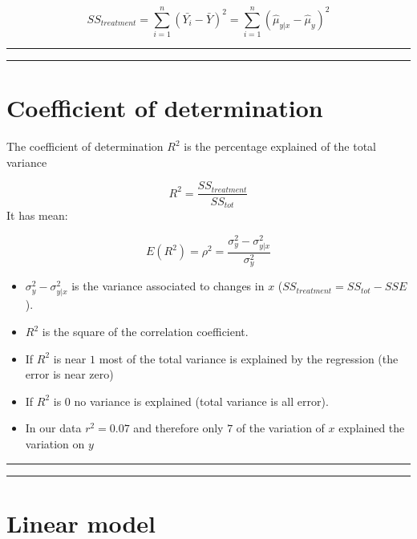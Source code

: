 \documentclass[
]{book}
\begin{document}
\[SS_{treatment}=\sum_{i=1}^n(\bar{Y_i}-\bar{Y})^2=\sum_{i=1}^n(\hat{\mu}_{y|x} -\hat{\mu}_y)^2\]

\begin{center}\rule{0.5\linewidth}{0.5pt}\end{center}

\begin{center}\rule{0.5\linewidth}{0.5pt}\end{center}

\hypertarget{coefficient-of-determination}{%
\section{Coefficient of determination}\label{coefficient-of-determination}}

The coefficient of determination \(R^2\) is the percentage explained of the total variance

\[R^2=\frac{SS_{treatment}}{SS_{tot}}\]
It has mean:

\[E(R^2)=\rho^2=\frac{\sigma^2_{y}-\sigma^2_{y|x}}{\sigma^2_{y}}\]

\begin{itemize}
\item
  \(\sigma_y^2-\sigma^2_{y|x}\) is the variance associated to changes in \(x\) (\(SS_{treatment}=SS_{tot} - SSE\)).
\item
  \(R^2\) is the square of the correlation coefficient.
\item
  If \(R^2\) is near \(1\) most of the total variance is explained by the regression (the error is near zero)
\item
  If \(R^2\) is \(0\) no variance is explained (total variance is all error).
\item
  In our data \(r^2=0.07\) and therefore only \(7%
  \) of the variation of \(x\) explained the variation on \(y\)
\end{itemize}

\begin{center}\rule{0.5\linewidth}{0.5pt}\end{center}

\begin{center}\rule{0.5\linewidth}{0.5pt}\end{center}

\hypertarget{linear-model-3}{%
\section{Linear model}\label{linear-model-3}}
\end{document}
